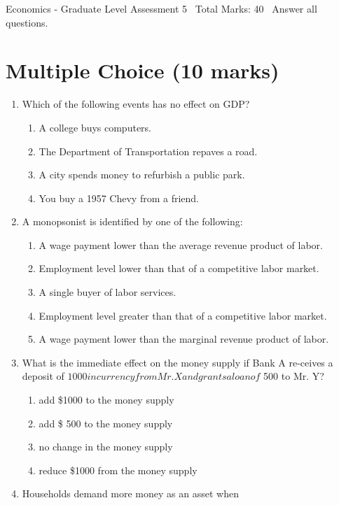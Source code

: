 \documentclass[12pt]{article}
\begin{document}
\begin{center}
Economics - Graduate Level Assessment 5 \
Total Marks: 40 \
Answer all questions.
\end{center}

\section*{Multiple Choice (10 marks)}
\begin{enumerate}[label=\arabic*.]
\item Which of the following events has no effect on GDP?
\begin{enumerate}[label=(\alph*)]
    \item A college buys computers.
    \item The Department of Transportation repaves a road.
    \item A city spends money to refurbish a public park.
    \item You buy a 1957 Chevy from a friend.
\end{enumerate}
\item A monopsonist is identified by one of the following:
\begin{enumerate}[label=(\alph*)]
    \item A wage payment lower than the average revenue product of labor.
    \item Employment level lower than that of a competitive labor market.
    \item A single buyer of labor services.
    \item Employment level greater than that of a competitive labor market.
    \item A wage payment lower than the marginal revenue product of labor.
\end{enumerate}
\item What is the immediate effect on the money supply if Bank A re-ceives a deposit of $ 1000 in currency from Mr. X and grants a loan of $ 500 to Mr. Y?
\begin{enumerate}[label=(\alph*)]
    \item add \$1000 to the money supply
    \item add \$ 500 to the money supply
    \item no change in the money supply
    \item reduce \$1000 from the money supply
\end{enumerate}
\item Households demand more money as an asset when

\end{enumerate}
\end{document}
